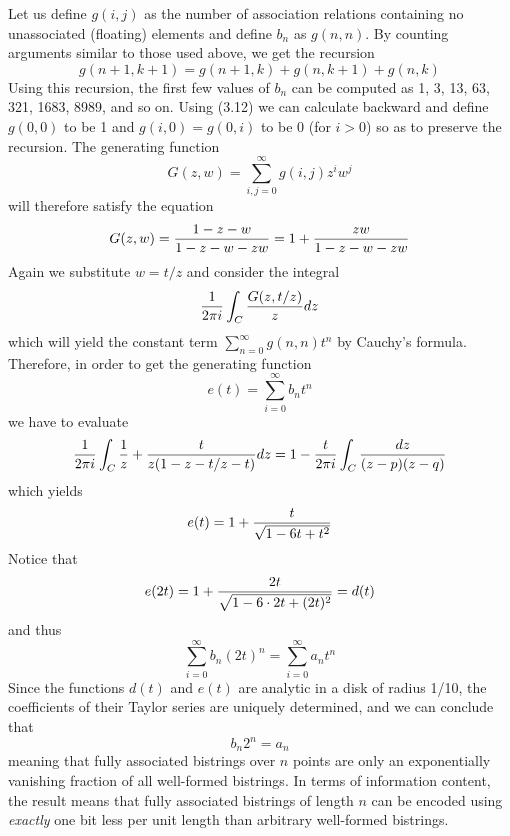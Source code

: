 Let us define $g(i,j)$ as the number of association relations containing no
unassociated (floating) elements and define $b_n$ as $g(n,n)$.  By
counting arguments similar to those used above, we get the recursion
\begin{equation}
g(n+1,k+1) = g(n+1,k) + g(n,k+1) +g(n,k)
\end{equation}
Using this recursion, the first few values of $b_n$ can be computed as
1, 3, 13, 63, 321, 1683, 8989, and so on.
Using (3.12) we can calculate backward and define $g(0,0)$ to be 1 and
$g(i,0)=g(0,i)$ to be 0 (for $i > 0$)
so as to preserve the recursion. The generating function
\begin{equation}
G(z,w) = \sum_{i,j=0}^{\infty} g(i,j)z^iw^j
\end{equation}
will therefore satisfy the equation
\begin{equation}
G(z,w) = {1 - z - w \over 1-z-w-zw} = 1+{zw \over 1-z-w-zw}
\end{equation}
Again we substitute $w=t/z$
and consider the integral
\begin{equation}
{1\over{2 \pi i}} \int_{C}{G(z,t/z)\over z}dz
\end{equation}
which will yield the constant term $ \sum_{n=0}^{\infty} g(n,n)t^n$ by
Cauchy's formula. Therefore, in order to get the generating function
\begin{equation}
e(t) = \sum_{i=0}^{\infty} b_n t^n
\end{equation}
we have to evaluate
\begin{equation}
{1\over {2 \pi i}} \int_{C}{{1 \over z} + {t \over
z(1-z-t/z -t)}}dz = 1 -{t\over {2 \pi i}} \int_{C}{dz \over (z-p)(z-q)}
\end{equation}
which yields
\begin{equation}
e(t) = 1 + {t \over \sqrt{1-6t+t^2}}
\end{equation}
Notice that
\begin{equation}
e(2t) = 1 + {2t \over \sqrt{1-6 \cdot 2t+(2t)^2}} = d(t)
\end{equation}
and thus
\begin{equation}
\sum_{i=0}^{\infty} b_n (2t)^n = \sum_{i=0}^{\infty} a_n t^n
\end{equation}
Since the functions $d(t)$ and $e(t)$ are analytic in a disk of radius
1/10, the coefficients of their Taylor series are uniquely determined,
and we can conclude that
\begin{equation}
b_n 2^n = a_n
\end{equation}
meaning that fully associated bistrings over $n$ points are only an
exponentially vanishing fraction of all well-formed bistrings. In terms of
information content, the result means that fully associated bistrings of
length $n$ can be encoded using {\it exactly} one bit less per unit length
than arbitrary well-formed bistrings.

